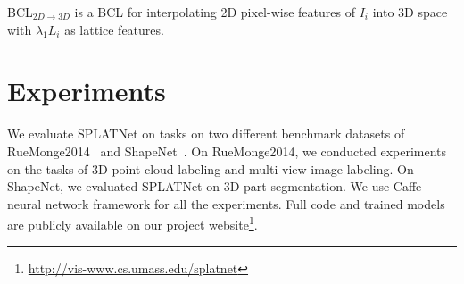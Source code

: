 \documentclass[10pt,twocolumn,letterpaper]{article}
\def\model{SPLATNet\xspace}
\newcommand{\hscomment}[1]{{\bf \textcolor{magenta}{HS: #1}}}
\begin{document}
BCL$_{2D\rightarrow 3D}$ is a BCL for interpolating 2D pixel-wise features of $I_i$ into 3D space with $\lambda_1 L_i$ as lattice features. %

\section{Experiments}\label{sec:exp}

We evaluate \model on tasks on two different benchmark datasets of
RueMonge2014~\cite{riemenschneider2014learning} and ShapeNet~\cite{yi2016scalable}.
On RueMonge2014, we conducted experiments on the tasks of 3D point cloud labeling
and multi-view image labeling. On ShapeNet, we evaluated \model on 3D part segmentation. We use Caffe~\cite{jia2014caffe} neural network framework for all the experiments.
Full code and trained models are publicly available on our project website\footnote{\url{http://vis-www.cs.umass.edu/splatnet}}.
\end{document}
